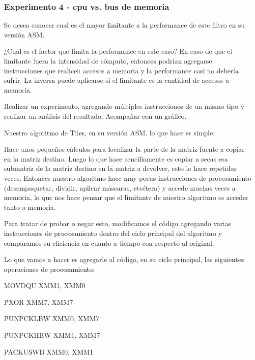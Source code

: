 \subsubsection{Experimento 4 - cpu vs. bus de memoria}

	Se desea conocer cual es el mayor limitante a la performance de este filtro en su versión ASM.

	¿Cuál es el factor que limita la performance en este caso? En caso de que el limitante
	fuera la intensidad de cómputo, entonces podrían agregarse instrucciones que realicen
	accesos a memoria y la performance casi no debería sufrir. La inversa puede aplicarse
	si el limitante es la cantidad de accesos a memoria.
	
	Realizar un experimento, agregando múltiples instrucciones de un mismo tipo y realizar un análisis
	del resultado. Acompañar con un gráfico.
\vspace*{0.3cm} \noindent

Nuestro algoritmo de Tiles, en su versión ASM, lo que hace es simple:\vspace*{0.3cm} \noindent

Hace unos pequeños cálculos para localizar la parte de la matriz fuente a copiar en la 
matriz destino. Luego lo que hace sencillamente es copiar a secas esa submatriz de la 
matriz destino en la matriz a devolver, esto lo hace repetidas veces. 
Entonces nuestro algoritmo hace muy pocas instrucciones de procesamiento (desempaquetar, 
dividir, aplicar máscaras, etcétera) y accede muchas veces a memoria, lo que nos hace pensar 
que el limitante de nuestro algoritmo es acceder tanto a memoria.\vspace*{0.3cm} \noindent

Para tratar de probar o negar esto, modificamos el código agregando varias instrucciones de 
procesamiento dentro del ciclo principal del algoritmo y comparamos su eficiencia en cuanto a 
tiempo con respecto al original.\vspace*{0.3cm} \noindent

Lo que vamos a hacer es agregarle al código, en su ciclo principal, las siguientes operaciones 
de procesamiento:\vspace*{0.3cm} \noindent


MOVDQU XMM1, XMM0

PXOR XMM7, XMM7 

PUNPCKLBW XMM0, XMM7

PUNPCKHBW XMM1, XMM7

PACKUSWB XMM0, XMM1
\vspace*{0.3cm} \noindent


